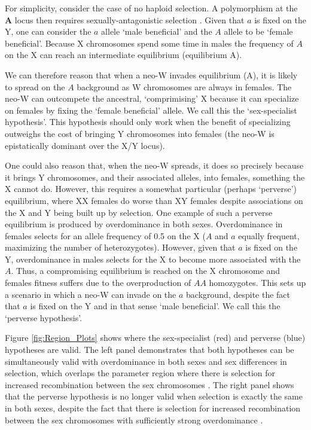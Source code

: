 \documentclass[12pt]{article}
\begin{document}
For simplicity, consider the case of no haploid selection.
A polymorphism at the $\mathbf{A}$ locus then requires sexually-antagonistic selection \citep{vanDoorn:2007eu}.
Given that $a$ is fixed on the Y, one can consider the $a$ allele `male beneficial' and the $A$ allele to be `female beneficial'. 
Because X chromosomes spend some time in males the frequency of $A$ on the X can reach an intermediate equilibrium (equilibrium A).

We can therefore reason that when a neo-W invades equilibrium (A), it is likely to spread on the $A$ background as W chromosomes are always in females.
The neo-W can outcompete the ancestral, `comprimising' X because it can specialize on females by fixing the `female beneficial' allele.  
We call this the `sex-specialist hypothesis'.
This hypothesis should only work when the benefit of specializing outweighs the cost of bringing Y chromosomes into females (the neo-W is epistatically dominant over the X/Y locus).

One could also reason that, when the neo-W spreads, it does so precisely because it brings Y chromosomes, and their associated alleles, into females, something the X cannot do.
However, this requires a somewhat particular (perhaps `perverse') equilibrium, where XX females do worse than XY females despite associations on the X and Y being built up by selection.
One example of such a perverse equilibrium is produced by overdominance in both sexes.
Overdominance in females selects for an allele frequency of 0.5 on the X ($A$ and $a$ equally frequent, maximizing the number of heterozygotes). 
However, given that $a$ is fixed on the Y, overdominance in males selects for the X to become more associated with the $A$. 
Thus, a compromising equilibrium is reached on the X chromosome and females fitness suffers due to the overproduction of $AA$ homozygotes.
This sets up a scenario in which a neo-W can invade on the $a$ background, despite the fact that $a$ is fixed on the Y and in that sense `male beneficial'.
We call this the `perverse hypothesis'.

Figure \ref{fig:Region_Plots} shows where the sex-specialist (red) and perverse (blue) hypotheses are valid.
The left panel demonstrates that both hypotheses can be simultaneously valid with overdominance in both sexes and sex differences in selection, which overlaps the parameter region where there is selection for increased recombination between the sex chromosomes \citep[compare with figure 2a in][]{Otto2014}.
The right panel shows that the perverse hypothesis is no longer valid when selection is exactly the same in both sexes, despite the fact that there is selection for increased recombination between the sex chromosomes with sufficiently strong overdominance \citep[compare with figure 3 in][]{Otto2014}.
\end{document}
